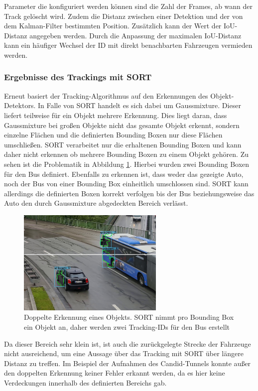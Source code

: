\documentclass[conference]{IEEEtran}
\begin{document}
	Parameter die konfiguriert werden können sind die Zahl der Frames, ab wann der
	Track gelöscht wird. Zudem die Distanz zwischen einer Detektion und der von dem
	Kalman-Filter bestimmten Position. Zusätzlich kann der Wert der IoU-Distanz angegeben werden.
	Durch die Anpassung der maximalen IoU-Distanz
	kann ein häufiger Wechsel der ID mit direkt benachbarten Fahrzeugen vermieden werden.
	
	\subsubsection{Ergebnisse des Trackings mit SORT}
	Erneut basiert der Tracking-Algorithmus auf den Erkennungen des Objekt-Detektors. In Falle von SORT handelt es sich dabei um Gaussmixture. Dieser liefert teilweise für ein Objekt mehrere Erkennung. Dies liegt daran, dass Gaussmixture bei großen Objekte nicht das gesamte Objekt erkennt, sondern einzelne Flächen und die definierten Bounding Boxen nur diese Flächen umschließen. SORT verarbeitet nur die erhaltenen Bounding Boxen und kann daher nicht erkennen ob mehrere Bounding Boxen zu einem Objekt gehören. Zu sehen ist die Problematik in Abbildung \ref{sortdouble}. Hierbei wurden zwei Bounding Boxen für den Bus definiert. Ebenfalls zu erkennen ist, dass weder das gezeigte Auto, noch der Bus von einer Bounding Box einheitlich umschlossen sind. SORT kann allerdings die definierten Boxen korrekt verfolgen bis der Bus beziehungsweise das Auto den durch Gaussmixture abgedeckten Bereich verlässt. 
	
	\begin{figure}[!h]
		\begin{center}
			\includegraphics[width=7cm]{Media/sortdouble.jpg}
			\caption{Doppelte Erkennung eines Objekts. SORT nimmt pro Bounding Box ein Objekt an, daher werden zwei Tracking-IDs für den Bus erstellt}
			\label{sortdouble}
		\end{center}
	\end{figure}

	Da dieser Bereich sehr klein ist, ist auch die zurückgelegte Strecke der Fahrzeuge nicht ausreichend, um eine Aussage über das Tracking mit SORT über längere Distanz zu treffen. 
	Im Beispiel der Aufnahmen des Candid-Tunnels konnte außer den doppelten Erkennung keiner Fehler erkannt werden, da es hier keine Verdeckungen innerhalb des definierten Bereichs gab.
	
\end{document}
